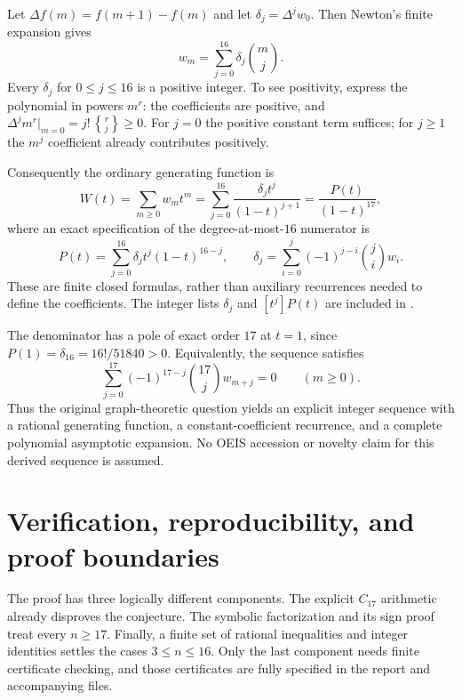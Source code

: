 \documentclass[11pt,a4paper]{article}
\theoremstyle{definition}
\newcommand{\bin}[2]{\binom{#1}{#2}}
\begin{document}
Let $\Delta f(m)=f(m+1)-f(m)$ and let $\delta_j=\Delta^jw_0$.
Then Newton's finite expansion gives
\begin{equation}\label{eq:newton}
   w_m=\sum_{j=0}^{16}\delta_j\bin mj.
\end{equation}
Every $\delta_j$ for $0\le j\le16$ is a positive integer. To see
positivity, express the polynomial in powers $m^r$: the coefficients
are positive, and $\Delta^jm^r|_{m=0}=j!\,{r\brace j}\ge0$.
For $j=0$ the positive constant term suffices; for $j\ge1$ the $m^j$
coefficient already contributes positively.

Consequently the ordinary generating function is
\begin{equation}\label{eq:wgf}
 W(t)=\sum_{m\ge0}w_mt^m
     =\sum_{j=0}^{16}\frac{\delta_jt^j}{(1-t)^{j+1}}
     =\frac{P(t)}{(1-t)^{17}},
\end{equation}
where an exact specification of the degree-at-most-$16$ numerator is
\begin{equation}\label{eq:Pnumerator}
 P(t)=\sum_{j=0}^{16}\delta_jt^j(1-t)^{16-j},\qquad
 \delta_j=\sum_{i=0}^j(-1)^{j-i}\bin ji w_i.
\end{equation}
These are finite closed formulas, rather than auxiliary recurrences
needed to define the coefficients. The integer lists $\delta_j$ and
$[t^j]P(t)$ are included in
.

The denominator has a pole of exact order $17$ at $t=1$, since
$P(1)=\delta_{16}=16!/51840>0$. Equivalently, the sequence satisfies
\begin{equation}\label{eq:wrec}
 \sum_{j=0}^{17}(-1)^{17-j}\bin{17}{j}w_{m+j}=0
 \qquad(m\ge0).
\end{equation}
Thus the original graph-theoretic question yields an explicit integer
sequence with a rational generating function, a constant-coefficient
recurrence, and a complete polynomial asymptotic expansion. No OEIS
accession or novelty claim for this derived sequence is assumed.

\section{Verification, reproducibility, and proof boundaries}\label{sec:verification}

The proof has three logically different components. The explicit
$C_{17}$ arithmetic already disproves the conjecture. The symbolic
factorization and its sign proof treat every $n\ge17$. Finally, a finite
set of rational inequalities and integer identities settles the cases
$3\le n\le16$. Only the last component needs finite certificate
checking, and those certificates are fully specified in the report and
accompanying files.
\end{document}
